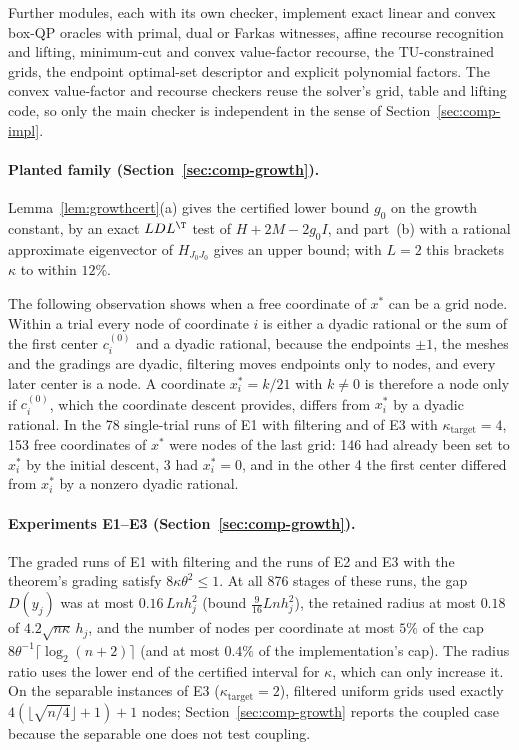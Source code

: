 Further modules, each with its own checker, implement exact linear and convex
box-QP oracles with primal, dual or Farkas witnesses, affine recourse
recognition and lifting, minimum-cut and convex value-factor recourse, the
TU-constrained grids, the endpoint optimal-set descriptor and explicit
polynomial factors. The convex value-factor and recourse checkers reuse the
solver's grid, table and lifting code, so only the main checker is
independent in the sense of Section~\ref{sec:comp-impl}.

\paragraph{Planted family (Section~\ref{sec:comp-growth}).}
Lemma~\ref{lem:growthcert}(a) gives the certified lower bound $g_0$ on the
growth constant, by an exact $LDL^\T$ test of $H+2M-2g_0I$, and part~(b) with
a rational approximate eigenvector of $H_{J_0J_0}$ gives an upper bound; with
$L=2$ this brackets $\kappa$ to within $12\%$.

The following observation shows when a free coordinate of $x^*$ can be a
grid node. Within a trial every node of coordinate $i$ is either a dyadic rational or the
sum of the first center $c_i^{(0)}$ and a dyadic rational, because the
endpoints $\pm1$, the meshes and the gradings are dyadic, filtering moves
endpoints only to nodes, and every later center is a node. A coordinate
$x^*_i=k/21$ with $k\ne0$ is therefore a node only if $c_i^{(0)}$, which the
coordinate descent provides, differs from $x^*_i$ by a dyadic rational. In the
78 single-trial runs of E1 with filtering and of E3 with
$\kappa_{\mathrm{target}}=4$, 153 free coordinates of $x^*$ were nodes of the
last grid: 146 had already been set to $x^*_i$ by the initial descent, 3 had
$x^*_i=0$, and in the other 4 the first center differed from $x^*_i$ by a
nonzero dyadic rational.

\paragraph{Experiments E1--E3 (Section~\ref{sec:comp-growth}).}
The graded runs of E1 with filtering and the runs of E2 and E3 with the
theorem's grading satisfy $8\kappa\theta^2\le1$. At all 876 stages of these
runs, the gap $D(y_j)$ was at most $0.16\,Lnh_j^2$ (bound
$\frac9{16}Lnh_j^2$), the retained radius at most $0.18$ of
$4.2\sqrt{n\kappa}\,h_j$, and the number of nodes per coordinate at most
$5\%$ of the cap $8\theta^{-1}\lceil\log_2(n+2)\rceil$ (and at most $0.4\%$ of
the implementation's cap). The radius ratio uses the lower end of the
certified interval for $\kappa$, which can only increase it.
On the separable instances of E3 ($\kappa_{\mathrm{target}}=2$), filtered
uniform grids used exactly $4(\lfloor\sqrt{n/4}\rfloor+1)+1$ nodes;
Section~\ref{sec:comp-growth} reports the coupled case because the separable
one does not test coupling.


